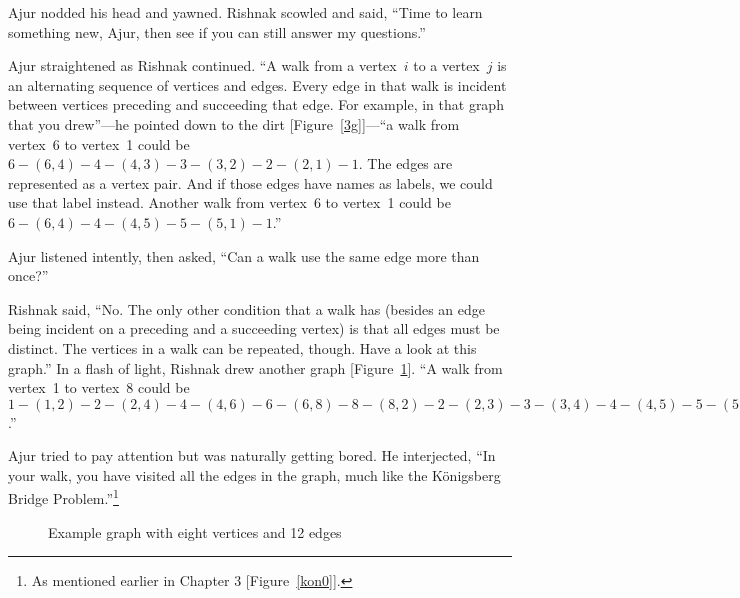 Ajur nodded his head and yawned.
Rishnak scowled and said, ``Time to learn something new, Ajur, then see if you can still answer my questions.''

Ajur straightened as Rishnak continued. ``A walk  from a vertex~$i$ to a vertex~$j$ is an alternating sequence of vertices and edges. Every edge in that walk is incident between vertices preceding and succeeding that edge. For example, in that graph that you drew''---he pointed down to the dirt [Figure~\ref{3g}]---``a walk from vertex~6 to vertex~1 could be $6-(6,4)-4-(4,3)-3-(3,2)-2-(2,1)-1$. The edges are represented as a vertex pair. And if those edges have names as labels, we could use that label instead. Another walk from vertex~6 to vertex~1 could be $6-(6,4)-4-(4,5)-5-(5,1)-1$.''

Ajur listened intently, then asked, ``Can a walk use the same edge more than once?''

Rishnak said, ``No. The only other condition that a walk has (besides an edge being incident on a preceding and a succeeding vertex) is that all edges must be distinct. The vertices in a walk can be repeated, though. Have a look at this graph.'' In a flash of light, Rishnak drew another graph [Figure~\ref{3g3}]. ``A walk from vertex~1 to vertex~8 could be $1-(1,2)-2-(2,4)-4-(4,6)-6-(6,8)-8-(8,2)-2-(2,3)-3-(3,4)-4-(4,5)-5-(5,6)-6-(6,7)-7-(7,8)-8$.''

Ajur tried to pay attention but was naturally getting bored. He interjected, ``In your walk, you have visited all the edges in the graph, much like the K\"{o}nigsberg Bridge Problem.''\footnote{As mentioned earlier in Chapter 3 [Figure~\ref{kon0}].}

\begin{figure}
\begin{center}
\caption{Example graph with eight vertices and 12 edges}\label{3g3}
\end{center}
\end{figure}

